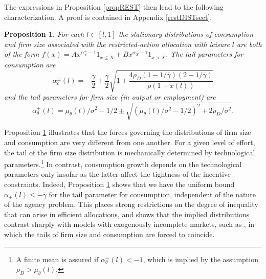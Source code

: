 \documentclass[11pt]{article}
\theoremstyle{plain}
\newtheorem{prop}[thm]{Proposition}
\begin{document}

The expressions in Proposition \ref{propREST} then lead to the following characterization. A proof is contained in Appendix \ref{restDISTsect}.

\begin{prop}\label{RESTdist}
For each $l \in [\underline{l},1]$ the stationary distributions of consumption and firm size associated with the restricted-action allocation with leisure $l$ are both of the form $f(x) = A x^{\alpha^+_X-1}1_{x \leq \overline{X}} + B x^{\alpha^-_X-1}1_{x > \overline{X}}$. The tail parameters for consumption are 
$$
\alpha^{\pm}_c (l) = -\frac{\overline{\gamma}}{2}  \pm  \frac{\overline{\gamma}}{2}\sqrt{1 + \frac{4\rho_D(1 - 1/\overline{\gamma}) (2-1/\overline{\gamma})}{\rho(1-x(l))}} 
$$ 
and the tail parameters for firm size (in output or employment) are 
$$
\alpha^{\pm}_\theta (l) = \mu_{\theta}(l)/\sigma^2 - 1/2 \pm \sqrt{(\mu_{\theta}(l)/\sigma^2 - 1/2)^2 + 2\rho_D/\sigma^2}.
$$
\end{prop}  %
Proposition \ref{RESTdist} illustrates that the forces governing the distributions of firm size and consumption are very different from one another. For a given level of effort, the tail of the firm size distribution is mechanically determined by technological parameters.\footnote{A finite mean is assured if $\alpha_{\theta}^-(l) < -1$, which is implied by the assumption $\rho_D > \mu_{\theta}(l)$.} In contrast, consumption growth depends on the technological parameters only insofar as the latter affect the tightness of the incentive constraints. Indeed, Proposition \ref{RESTdist} shows that we have the uniform bound $\alpha_\pm (l) \leq -\overline{\gamma}$ for the tail parameter for consumption, independent of the nature of the agency problem. This places strong restrictions on the degree of inequality that can arise in efficient allocations, and shows that the implied distributions contrast sharply with models with exogenously incomplete markets, such as \cite{jones_schumpeterian_2018}, in which the tails of firm size and consumption are forced to coincide. 
\end{document}
